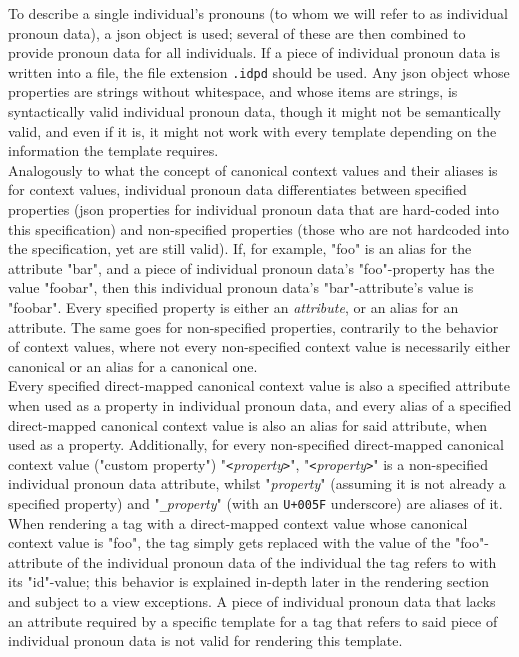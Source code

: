 \documentclass{article}
\begin{document}
    To describe a single individual's pronouns (to whom we will refer to as individual pronoun data), a json object is used;
    several of these are then combined to provide pronoun data for all individuals.
    If a piece of individual pronoun data is written into a file, the file extension \texttt{.idpd} should be used.
    Any json object whose properties are strings without whitespace, and whose items are strings, is syntactically valid individual pronoun data, though it might not be semantically valid, and even if it is, it might not work with every template depending on the information the template requires.\\

    Analogously to what the concept of canonical context values and their aliases is for context values, individual pronoun data differentiates between specified properties (json properties for individual pronoun data that are hard-coded into this specification) and non-specified properties (those who are not hardcoded into the specification, yet are still valid).
    If, for example, "foo" is an alias for the attribute "bar", and a piece of individual pronoun data's "foo"-property has the value "foobar", then this individual pronoun data's "bar"-attribute's value is "foobar".
    Every specified property is either an \emph{attribute}, or an alias for an attribute.
    The same goes for non-specified properties, contrarily to the behavior of context values, where not every non-specified context value is necessarily either canonical or an alias for a canonical one.\\

    Every specified direct-mapped canonical context value is also a specified attribute when used as a property in individual pronoun data, and every alias of a specified direct-mapped canonical context value is also an alias for said attribute, when used as a property.
    Additionally, for every non-specified direct-mapped canonical context value ("custom property") "\texttt{<}\emph{property}\texttt{>}", "\texttt{<}\emph{property}\texttt{>}" is a non-specified individual pronoun data attribute, whilst "\emph{property}" (assuming it is not already a specified property) and "\texttt{\_}\emph{property}" (with an \texttt{U+005F} underscore) are aliases of it.\\

    When rendering a tag with a direct-mapped context value whose canonical context value is "foo", the tag simply gets replaced with the value of the "foo"-attribute of the individual pronoun data of the individual the tag refers to with its "id"-value;
    this behavior is explained in-depth later in the rendering section and subject to a view exceptions.
    A piece of individual pronoun data that lacks an attribute required by a specific template for a tag that refers to said piece of individual pronoun data is not valid for rendering this template.\\
\end{document}

